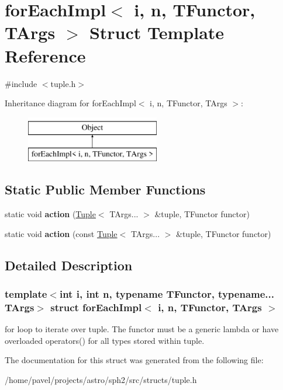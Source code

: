 \hypertarget{structforEachImpl}{}\section{for\+Each\+Impl$<$ i, n, T\+Functor, T\+Args $>$ Struct Template Reference}
\label{structforEachImpl}


{\ttfamily \#include $<$tuple.\+h$>$}

Inheritance diagram for for\+Each\+Impl$<$ i, n, T\+Functor, T\+Args $>$\+:\begin{figure}[H]
\begin{center}
\leavevmode
\includegraphics[height=2.000000cm]{structforEachImpl}
\end{center}
\end{figure}
\subsection*{Static Public Member Functions}
\begin{DoxyCompactItemize}
\item 
\hypertarget{structforEachImpl_a30c25aa31f9b359a35a8f0352977bd10}{}\label{structforEachImpl_a30c25aa31f9b359a35a8f0352977bd10} 
static void {\bfseries action} (\hyperlink{classTuple}{Tuple}$<$ T\+Args... $>$ \&tuple, T\+Functor functor)
\item 
\hypertarget{structforEachImpl_a982d6b72789b6540046780db843bdfd1}{}\label{structforEachImpl_a982d6b72789b6540046780db843bdfd1} 
static void {\bfseries action} (const \hyperlink{classTuple}{Tuple}$<$ T\+Args... $>$ \&tuple, T\+Functor functor)
\end{DoxyCompactItemize}


\subsection{Detailed Description}
\subsubsection*{template$<$int i, int n, typename T\+Functor, typename... T\+Args$>$\newline
struct for\+Each\+Impl$<$ i, n, T\+Functor, T\+Args $>$}

for loop to iterate over tuple. The functor must be a generic lambda or have overloaded operators() for all types stored within tuple. 

The documentation for this struct was generated from the following file\+:\begin{DoxyCompactItemize}
\item 
/home/pavel/projects/astro/sph2/src/structs/tuple.\+h\end{DoxyCompactItemize}
